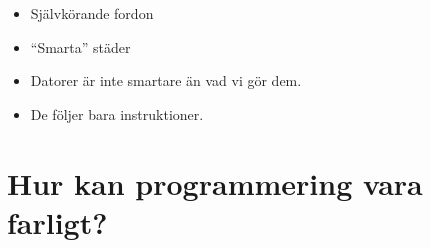 
\begin{frame}
  \begin{example}
    \begin{itemize}
      \item Självkörande fordon
      \item \enquote{Smarta} städer
    \end{itemize}
  \end{example}

  \pause

  \begin{remark}
    \begin{itemize}
      \item Datorer är inte smartare än vad vi gör dem.
      \item De följer bara instruktioner.
    \end{itemize}
  \end{remark}
\end{frame}


\section[Kan det vara farligt?]{Hur kan programmering vara farligt?}





